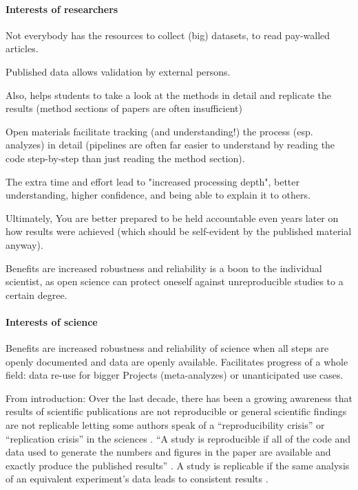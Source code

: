 \paragraph{Interests of researchers}


%
Not everybody has the resources to collect (big) datasets, to read pay-walled
articles.

%
Published data allows validation by external persons.

%
Also, helps students to take a look at the methods in detail and replicate the
results (method sections of papers are often insufficient)

%
Open materials facilitate tracking (and understanding!) the process (esp.
analyzes) in detail (pipelines are often far easier to understand by reading the
code step-by-step than just reading the method section).

%
The extra time and effort lead to "increased processing depth", better
understanding, higher confidence, and being able to explain it to others.

%
Ultimately, You are better prepared to be held accountable even years later on
how results were achieved (which should be self-evident by the published
material anyway).

%
Benefits are increased robustness and reliability is a boon to the individual
scientist, as open science can protect oneself against unreproducible studies to
a certain degree.



\paragraph{Interests of science}

%
Benefits are increased robustness and reliability of science when all steps are
openly documented and data are openly available.
%
Facilitates progress of a whole field: data re-use for bigger Projects
(meta-analyzes) or unanticipated use cases.

From introduction:
Over the last decade, there has been a growing awareness that results of
scientific publications are not reproducible or general scientific findings are
not replicable letting some authors speak of a ``reproducibility crisis'' or
``replication crisis'' in the sciences \citep{baker2016reproducibility,
plesser2018reproducibility, stupple2019reproducibility, nosek2022replicability}.
``A study is reproducible if all of the code and data used to generate the
numbers and figures in the paper are available and exactly produce the published
results'' \citep{leek2017most}.
A study is replicable if the same analysis of an equivalent experiment's data
leads to consistent results \citep{dubois2016building, leek2017most}.



